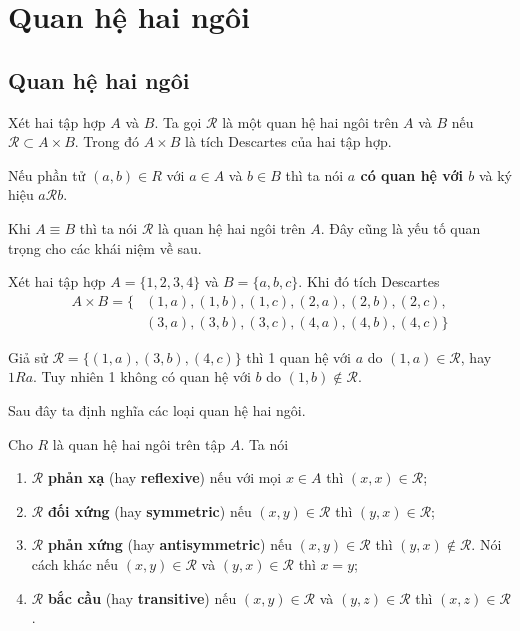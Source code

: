 \documentclass{mynotes}
\begin{document}


\chapter{Quan hệ hai ngôi}

\section{Quan hệ hai ngôi}

\begin{definition}
    Xét hai tập hợp $A$ và $B$. Ta gọi $\mathcal{R}$ là một quan hệ hai ngôi trên $A$ và $B$ nếu $\mathcal{R} \subset A \times B$. Trong đó $A \times B$ là tích Descartes của hai tập hợp.
\end{definition}

Nếu phần tử $(a, b) \in R$ với $a \in A$ và $b \in B$ thì ta nói \textbf{$a$ có quan hệ với $b$} và ký hiệu $a \mathcal{R} b$.

Khi $A \equiv B$ thì ta nói $\mathcal{R}$ là quan hệ hai ngôi trên $A$. Đây cũng là yếu tố quan trọng cho các khái niệm về sau.

\begin{example}
    Xét hai tập hợp $A = \{1, 2, 3, 4\}$ và $B = \{a, b, c\}$. Khi đó tích Descartes 
    \begin{align*}
        A \times B = \{
        & (1, a), (1, b), (1, c), (2, a), (2, b), (2, c), \\
        & (3, a), (3, b), (3, c), (4, a), (4, b), (4, c)
    \}
    \end{align*}

    Giả sử $\mathcal{R} = \{(1, a), (3, b), (4, c)\}$ thì 1 quan hệ với $a$ do $(1, a) \in \mathcal{R}$, hay $1 R a$. Tuy nhiên 1 không có quan hệ với $b$ do $(1, b) \not\in \mathcal{R}$.
\end{example}

Sau đây ta định nghĩa các loại quan hệ hai ngôi.

\begin{definition}
    Cho $R$ là quan hệ hai ngôi trên tập $A$. Ta nói
    \begin{enumerate}
        \item $\mathcal{R}$ \textbf{phản xạ} (hay \textbf{reflexive}) nếu với mọi $x \in A$ thì $(x, x) \in \mathcal{R}$;
        \item $\mathcal{R}$ \textbf{đối xứng} (hay \textbf{symmetric}) nếu $(x, y) \in \mathcal{R}$ thì $(y, x) \in \mathcal{R}$;
        \item $\mathcal{R}$ \textbf{phản xứng} (hay \textbf{antisymmetric}) nếu $(x, y) \in \mathcal{R}$ thì $(y, x) \not\in \mathcal{R}$. Nói cách khác nếu $(x, y) \in \mathcal{R}$ và $(y, x) \in \mathcal{R}$ thì $x = y$;
        \item $\mathcal{R}$ \textbf{bắc cầu} (hay \textbf{transitive}) nếu $(x, y) \in \mathcal{R}$ và $(y, z) \in \mathcal{R}$ thì $(x, z) \in \mathcal{R}$.
    \end{enumerate}
\end{definition}
\end{document}
